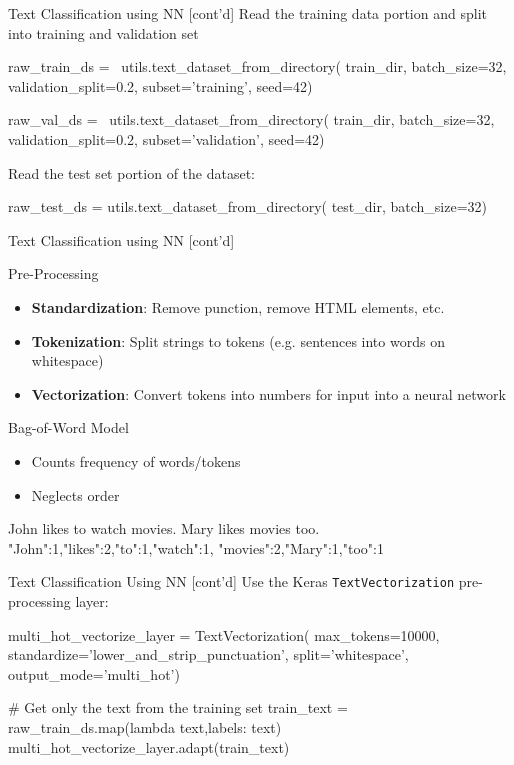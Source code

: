 \documentclass[ignorenonframetext,xcolor=x11names]{beamer}
\begin{document}
\begin{frame}[fragile]{Text Classification using NN \small [cont'd]}
Read the training data portion and split into training and validation set
\begin{pythoncode}
raw_train_ds = \
utils.text_dataset_from_directory(
    train_dir, batch_size=32,
    validation_split=0.2,
    subset='training', seed=42)
    
raw_val_ds = \
utils.text_dataset_from_directory(
    train_dir, batch_size=32,
    validation_split=0.2,
    subset='validation', seed=42)
\end{pythoncode}
Read the test set portion of the dataset:
\begin{pythoncode}
raw_test_ds = utils.text_dataset_from_directory(
    test_dir, batch_size=32)
\end{pythoncode}
\end{frame}

\begin{frame}[fragile]{Text Classification using NN \small [cont'd]}
\begin{block}{Pre-Processing}
\begin{itemize}
   \item \textbf{Standardization}: Remove punction, remove HTML elements, etc.
   \item \textbf{Tokenization}: Split strings to tokens (e.g. sentences into words on whitespace)
   \item \textbf{Vectorization}: Convert tokens into numbers for input into a neural network
\end{itemize}
\end{block}
\begin{block}{Bag-of-Word Model}
\begin{itemize}
   \item Counts frequency of words/tokens
   \item Neglects order
\end{itemize}
\begin{textcode}
John likes to watch movies. Mary likes movies too.
{"John":1,"likes":2,"to":1,"watch":1,
 "movies":2,"Mary":1,"too":1}
\end{textcode}
\end{block}
\end{frame}


\begin{frame}[fragile]{Text Classification Using NN \small [cont'd]}
Use the Keras \texttt{TextVectorization} pre-processing layer:
\begin{pythoncode}
multi_hot_vectorize_layer = TextVectorization(
    max_tokens=10000,
    standardize='lower_and_strip_punctuation',
    split='whitespace',
    output_mode='multi_hot')
    
# Get only the text from the training set
train_text = raw_train_ds.map(lambda text,labels: text)
multi_hot_vectorize_layer.adapt(train_text)
\end{pythoncode}
\end{frame}
\end{document}
